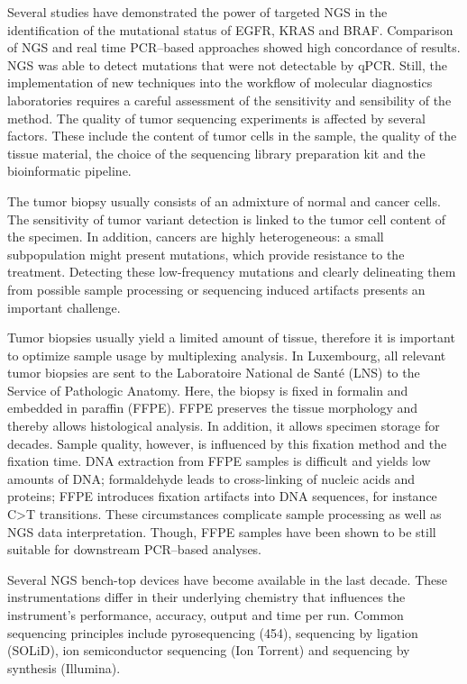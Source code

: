 {{      Several studies have demonstrated the power of targeted NGS in the
      identification of the mutational status of EGFR, KRAS and BRAF. Comparison
      of NGS and real time PCR--based approaches showed high concordance of
      results. NGS was able to detect mutations that were not detectable by
      qPCR. Still, the implementation of new techniques into the workflow of molecular
      diagnostics laboratories requires a careful assessment of the sensitivity
      and sensibility of the method. The quality of tumor sequencing
      experiments is affected by several factors. These include the content of
      tumor cells in the sample, the quality of the tissue material, the choice
      of the sequencing library preparation kit and the bioinformatic pipeline.

      The tumor biopsy usually consists of an admixture of normal and cancer
      cells. The sensitivity of tumor variant detection is linked to the tumor
      cell content of the specimen. In addition, cancers are highly
      heterogeneous: a small subpopulation might present mutations, which
      provide resistance to the treatment. Detecting these low-frequency
      mutations and clearly delineating them from possible sample processing or
      sequencing induced artifacts presents an important challenge.

      Tumor biopsies usually yield a limited amount of tissue, therefore it is
      important to optimize sample usage by multiplexing analysis. In
      Luxembourg, all relevant tumor biopsies are sent to the
      Laboratoire National de Santé (LNS) to the Service of Pathologic Anatomy.
      Here, the biopsy is fixed in formalin and embedded in paraffin (FFPE).
      FFPE preserves the tissue morphology and thereby allows histological
      analysis. In addition, it allows specimen storage for decades. Sample
      quality, however, is influenced by this fixation method and the fixation
      time. DNA extraction from FFPE samples is difficult and yields low amounts
      of DNA; formaldehyde leads to cross-linking of nucleic acids and proteins;
      FFPE introduces fixation artifacts into DNA sequences, for instance C>T
      transitions. These circumstances complicate sample processing as well as
      NGS data interpretation. Though, FFPE samples have been shown to be still
      suitable for downstream PCR--based analyses.

      Several NGS bench-top devices have become available in the last decade.
      These instrumentations differ in their underlying chemistry that
      influences the instrument’s performance, accuracy, output and time per
      run. Common sequencing principles include pyrosequencing (454), sequencing
      by ligation (SOLiD), ion semiconductor sequencing (Ion Torrent) and
      sequencing by synthesis (Illumina).

}}
